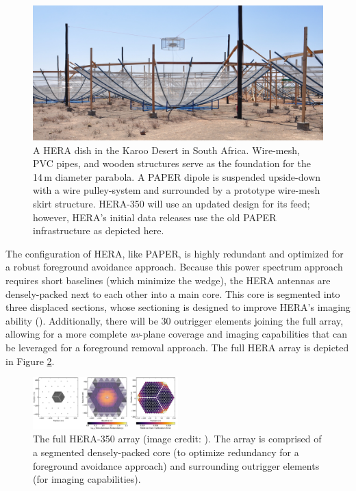 \begin{figure}
    \centering
    \includegraphics[width=1\textwidth]{plots/hera_dish.jpg}
    \caption{A HERA dish in the Karoo Desert in South Africa. Wire-mesh, PVC pipes, and wooden structures serve as the foundation for the 14\,m diameter parabola. A PAPER dipole is suspended upside-down with a wire pulley-system and surrounded by a prototype wire-mesh skirt structure. HERA-350 will use an updated design for its feed; however, HERA's initial data releases use the old PAPER infrastructure as depicted here.}
    \label{fig:hera_dish}
\end{figure}

The configuration of HERA, like PAPER, is highly redundant and optimized for a robust foreground avoidance approach. Because this power spectrum approach requires short baselines (which minimize the wedge), the HERA antennas are densely-packed next to each other into a main core. This core is segmented into three displaced sections, whose sectioning is designed to improve HERA's imaging ability (\citealt{dillon_parsons2016}). Additionally, there will be 30 outrigger elements joining the full array, allowing for a more complete \textit{uv}-plane coverage and imaging capabilities that can be leveraged for a foreground removal approach. The full HERA array is depicted in Figure \ref{fig:hera_array}. 

\begin{figure}
    \centering
    \includegraphics[width=0.5\textwidth]{plots/hera_array.pdf}
    \caption{The full HERA-350 array (image credit: \citet{deboer_et_al2017}). The array is comprised of a segmented densely-packed core (to optimize redundancy for a foreground avoidance approach) and surrounding outrigger elements (for imaging capabilities).}
    \label{fig:hera_array}
\end{figure}

